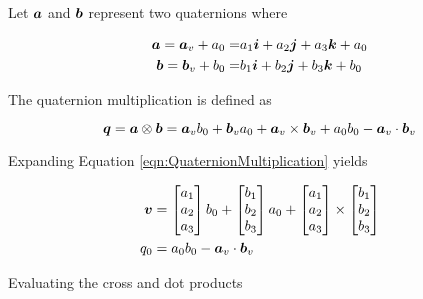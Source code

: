 Let $\boldsymbol{a}$ and $\boldsymbol{b}$ represent two quaternions where

\begin{subequations}
\begin{align}
  \boldsymbol{a} = \boldsymbol{a}_v + a_0 = & a_1 \boldsymbol{i} + a_2 \boldsymbol{j} + a_3 \boldsymbol{k} + a_0\\
  \boldsymbol{b} = \boldsymbol{b}_v + b_0 = & b_1 \boldsymbol{i} + b_2 \boldsymbol{j} + b_3 \boldsymbol{k} + b_0
\end{align}
\end{subequations}

The quaternion multiplication is defined as

\begin{equation}
  \boldsymbol{q} = \boldsymbol{a} \otimes \boldsymbol{b} = \boldsymbol{a}_v b_0 + \boldsymbol{b}_v a_0 + \boldsymbol{a}_v \times \boldsymbol{b}_v + a_0 b_0 - \boldsymbol{a}_v \cdot \boldsymbol{b}_v
  \label{eqn:QuaternionMultiplication}
\end{equation}

Expanding Equation \ref{eqn:QuaternionMultiplication} yields

\begin{subequations}
\begin{align}
  \boldsymbol{v} & = \begin{bmatrix} a_1 \\ a_2 \\ a_3 \end{bmatrix} b_0 +\begin{bmatrix} b_1 \\ b_2 \\ b_3 \end{bmatrix} a_0 + \begin{bmatrix} a_1 \\ a_2 \\ a_3 \end{bmatrix} \times \begin{bmatrix} b_1 \\ b_2 \\ b_3 \end{bmatrix} \\
  q_0 & = a_0 b_0 - \boldsymbol{a}_v \cdot \boldsymbol{b}_v
\end{align}
\end{subequations}

Evaluating the cross and dot products

